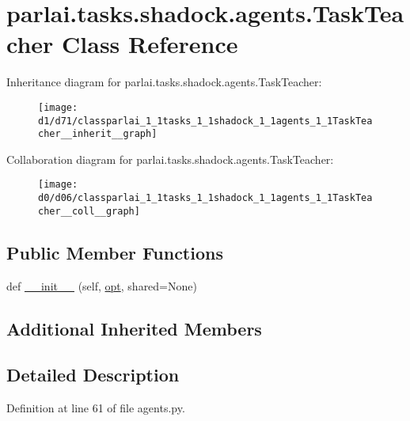 \hypertarget{classparlai_1_1tasks_1_1shadock_1_1agents_1_1TaskTeacher}{}\section{parlai.\+tasks.\+shadock.\+agents.\+Task\+Teacher Class Reference}
\label{classparlai_1_1tasks_1_1shadock_1_1agents_1_1TaskTeacher}


Inheritance diagram for parlai.\+tasks.\+shadock.\+agents.\+Task\+Teacher\+:
\nopagebreak
\begin{figure}[H]
\begin{center}
\leavevmode
\texttt{[image: d1/d71/classparlai\_1\_1tasks\_1\_1shadock\_1\_1agents\_1\_1TaskTeacher\_\_inherit\_\_graph]}
\end{center}
\end{figure}


Collaboration diagram for parlai.\+tasks.\+shadock.\+agents.\+Task\+Teacher\+:
\nopagebreak
\begin{figure}[H]
\begin{center}
\leavevmode
\texttt{[image: d0/d06/classparlai\_1\_1tasks\_1\_1shadock\_1\_1agents\_1\_1TaskTeacher\_\_coll\_\_graph]}
\end{center}
\end{figure}
\subsection*{Public Member Functions}
\begin{DoxyCompactItemize}
\item 
def \hyperlink{classparlai_1_1tasks_1_1shadock_1_1agents_1_1TaskTeacher_ae092a060ee469d5ffe511ad6bbed2fa9}{\+\_\+\+\_\+init\+\_\+\+\_\+} (self, \hyperlink{classparlai_1_1core_1_1teachers_1_1FbDialogTeacher_af7a9ec497b9cd0292d7b8fa220da7c28}{opt}, shared=None)
\end{DoxyCompactItemize}
\subsection*{Additional Inherited Members}


\subsection{Detailed Description}


Definition at line 61 of file agents.\+py.



